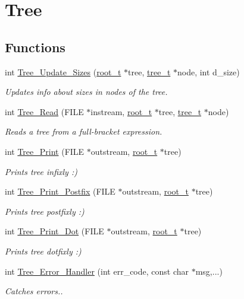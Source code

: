 \hypertarget{group__tree}{\section{Tree}
\label{group__tree}
}
\subsection*{Functions}
\begin{DoxyCompactItemize}
\item 
int \hyperlink{group__tree_gac5503c52682012192527d698eb6d7de4}{Tree\-\_\-\-Update\-\_\-\-Sizes} (\hyperlink{structroot__t}{root\-\_\-t} $\ast$tree, \hyperlink{structtree__t}{tree\-\_\-t} $\ast$node, int d\-\_\-size)
\begin{DoxyCompactList}\small\item\em Updates info about sizes in nodes of the tree. \end{DoxyCompactList}\item 
int \hyperlink{group__tree_ga92318dbe92c0db5f435b4ae68d4417c9}{Tree\-\_\-\-Read} (F\-I\-L\-E $\ast$instream, \hyperlink{structroot__t}{root\-\_\-t} $\ast$tree, \hyperlink{structtree__t}{tree\-\_\-t} $\ast$node)
\begin{DoxyCompactList}\small\item\em Reads a tree from a full-\/bracket expression. \end{DoxyCompactList}\item 
int \hyperlink{group__tree_ga8152f1bb640d24bc31af5c5311e62591}{Tree\-\_\-\-Print} (F\-I\-L\-E $\ast$outstream, \hyperlink{structroot__t}{root\-\_\-t} $\ast$tree)
\begin{DoxyCompactList}\small\item\em Prints tree infixly \-:) \end{DoxyCompactList}\item 
int \hyperlink{group__tree_ga9caac287efe9cb8a6b3153f609510e48}{Tree\-\_\-\-Print\-\_\-\-Postfix} (F\-I\-L\-E $\ast$outstream, \hyperlink{structroot__t}{root\-\_\-t} $\ast$tree)
\begin{DoxyCompactList}\small\item\em Prints tree postfixly \-:) \end{DoxyCompactList}\item 
int \hyperlink{group__tree_ga4628406011a00c283a144512151690c3}{Tree\-\_\-\-Print\-\_\-\-Dot} (F\-I\-L\-E $\ast$outstream, \hyperlink{structroot__t}{root\-\_\-t} $\ast$tree)
\begin{DoxyCompactList}\small\item\em Prints tree dotfixly \-:) \end{DoxyCompactList}\item 
int \hyperlink{group__tree_gadf8f965550be1db1339b97be5182b102}{Tree\-\_\-\-Error\-\_\-\-Handler} (int err\-\_\-code, const char $\ast$msg,...)
\begin{DoxyCompactList}\small\item\em Catches errors.. \end{DoxyCompactList}\end{DoxyCompactItemize}


